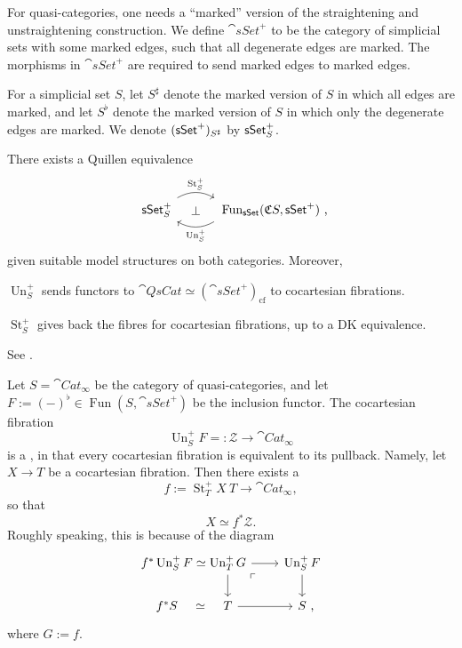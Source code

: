 For quasi-categories, one needs a ``marked'' version
of the straightening and unstraightening construction.
We define $\cat{sSet}^+$ to be the category of simplicial sets 
with some marked edges, such that all degenerate edges are marked.
The morphisms in $\cat{sSet}^+$ are required to send marked edges to marked edges.

For a simplicial set $S$, let $S^\sharp$ denote 
the marked version of $S$ in which all edges are marked,
and let $S^\flat$ denote the marked version of $S$
in which only the degenerate edges are marked.
We denote $(\mathsf{sSet}^+)_{\/{S^\sharp}}$ by $\mathsf{sSet}^+_{\/S}$.

\begin{theorem}
    There exists a Quillen equivalence
    \[\begin{tikzcd}[column sep=3em]
        \cat{sSet}^+_{\/S}\ar[r,bend left,start anchor=north east,end anchor=north west,"\operatorname{St}_S^+"]
        \ar[r,phantom,"\bot"] &
        \vphantom{\cat{sSet}^+_{\/S}}
        \operatorname{Fun}_{\cat{sSet}}(\mathfrak CS,\cat{sSet}^+)\rlap{\ ,}
        \ar[l,bend left,start anchor=south west,end anchor=south east,"\operatorname{Un}_S^+"]
    \end{tikzcd}\]
    given suitable model structures on both categories.
    Moreover, 
    \begin{itms}
        \item $\operatorname{Un}_S^+$ sends functors to
        $\cat{QsCat}\simeq(\cat{sSet}^+)_{\mathrm{cf}}$
        to cocartesian fibrations.
        \item $\operatorname{St}_S^+$ gives back the fibres
        for cocartesian fibrations,
        up to a DK equivalence.
    \end{itms}
\end{theorem}

See \cite[Theorem~3.2.0.1]{htt}.

\begin{example}
    Let $S=\cat{Cat}_\infty$ be the category of quasi-categories,
    and let $F:=(-)^\flat\in\operatorname{Fun}(S,\cat{sSet}^+)$
    be the inclusion functor.
    The cocartesian fibration 
    \[ \operatorname{Un}_S^+F=:\mathscr Z\to\cat{Cat}_\infty \]
    is a , in that every cocartesian fibration 
    is equivalent to its pullback.
    Namely, let $X\to T$ be a cocartesian fibration.
    Then there exists a 
    \[ f:=\operatorname{St}_T^+X\:T\to\cat{Cat}_\infty, \]
    so that 
    \[ X\simeq f^*\mathscr Z. \]
    Roughly speaking, this is because of the diagram 
    \[ \begin{tikzcd}[column sep=.5em]
        f^*\operatorname{Un}_S^+F \ar[r,phantom,"\simeq"] &
        \operatorname{Un}_T^+G \ar[rr]\ar[d]\ar[drr,phantom,very near start,"\ulcorner"] & \ &
        \operatorname{Un}_S^+F\ar[d] \\
        f^*S \ar[r,phantom,"\simeq"] & T\ar[rr] && S\rlap{\ ,}
    \end{tikzcd} \]
    where $G:=f$. \varqed
\end{example}
